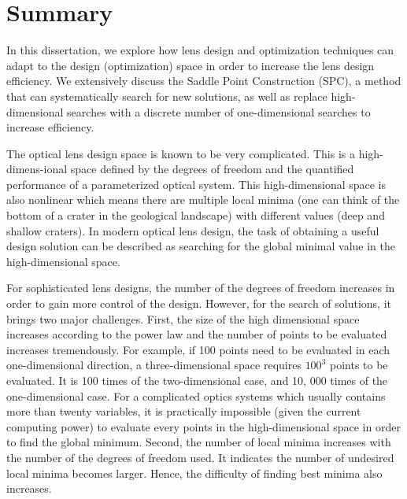\chapter*{Summary}

In this dissertation, we explore how lens design and optimization techniques can adapt to the design (optimization) space in order to increase the lens design efficiency. We extensively discuss the Saddle Point Construction (SPC), a method that can systematically search for new solutions, as well as replace high-dimensional searches with a discrete number of one-dimensional searches to increase efficiency. 

The optical lens design space is known to be very complicated. This is a high-dimens-ional space defined by the degrees of freedom and the quantified performance of a parameterized optical system. This high-dimensional space is also nonlinear which means there are multiple local minima (one can think of the bottom of a crater in the geological landscape) with different values (deep and shallow craters). In modern optical lens design, the task of obtaining a useful design solution can be described as searching for the global minimal value in the high-dimensional space. 

For sophisticated lens designs, the number of the degrees of freedom increases in order to gain more control of the design. However, for the search of solutions, it brings two major challenges. First, the size of the high dimensional space increases according to the power law and the number of points to be evaluated increases tremendously. For example, if 100 points need to be evaluated in each one-dimensional direction, a three-dimensional space requires $100^3$ points to be evaluated. It is 100 times of the two-dimensional case, and 10, 000 times of the one-dimensional case. For a complicated optics systems which usually contains more than twenty variables, it is practically impossible (given the current computing power) to evaluate every points in the high-dimensional space in order to find the global minimum.  Second, the number of local minima increases with the number of the degrees of freedom used. It indicates the number of undesired local minima becomes larger. Hence, the difficulty of finding best minima also increases.  

